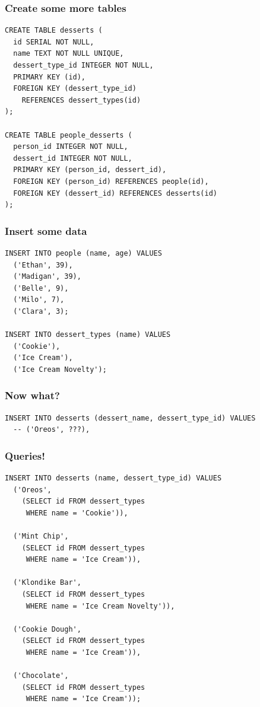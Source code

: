 \documentclass[aspectratio=169]{beamer}
\begin{document}
\begin{frame}[fragile]
  \frametitle{Create some more tables}

  \begin{lstlisting}
CREATE TABLE desserts (
  id SERIAL NOT NULL,
  name TEXT NOT NULL UNIQUE,
  dessert_type_id INTEGER NOT NULL,
  PRIMARY KEY (id),
  FOREIGN KEY (dessert_type_id)
    REFERENCES dessert_types(id)
);

CREATE TABLE people_desserts (
  person_id INTEGER NOT NULL,
  dessert_id INTEGER NOT NULL,
  PRIMARY KEY (person_id, dessert_id),
  FOREIGN KEY (person_id) REFERENCES people(id),
  FOREIGN KEY (dessert_id) REFERENCES desserts(id)
);

  \end{lstlisting}

\end{frame}


\begin{frame}[fragile]
  \frametitle{Insert some data}
  \begin{lstlisting}
INSERT INTO people (name, age) VALUES
  ('Ethan', 39),
  ('Madigan', 39),
  ('Belle', 9),
  ('Milo', 7),
  ('Clara', 3);

INSERT INTO dessert_types (name) VALUES
  ('Cookie'),
  ('Ice Cream'),
  ('Ice Cream Novelty');
  \end{lstlisting}
\end{frame}

\begin{frame}[fragile]
  \frametitle{Now what?}
  \begin{lstlisting}
INSERT INTO desserts (dessert_name, dessert_type_id) VALUES
  -- ('Oreos', ???),
  \end{lstlisting}
\end{frame}

\begin{frame}[fragile]
  \frametitle{Queries!}
  \begin{lstlisting}
INSERT INTO desserts (name, dessert_type_id) VALUES
  ('Oreos',
    (SELECT id FROM dessert_types
     WHERE name = 'Cookie')),

  ('Mint Chip',
    (SELECT id FROM dessert_types
     WHERE name = 'Ice Cream')),

  ('Klondike Bar',
    (SELECT id FROM dessert_types
     WHERE name = 'Ice Cream Novelty')),

  ('Cookie Dough',
    (SELECT id FROM dessert_types
     WHERE name = 'Ice Cream')),

  ('Chocolate',
    (SELECT id FROM dessert_types
     WHERE name = 'Ice Cream'));
  \end{lstlisting}
\end{frame}
\end{document}
